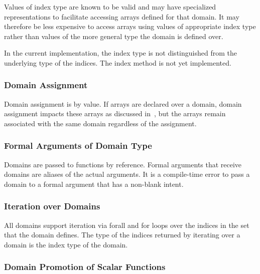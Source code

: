 Values of index type are known to be valid and may have specialized
representations to facilitate accessing arrays defined for that
domain. It may therefore be less expensive to access arrays using
values of appropriate index type rather than values of the more
general type the domain is defined over.

\begin{implementation}
In the current implementation, the index type is not distinguished
from the underlying type of the indices.  The index method is not yet
implemented.
\end{implementation}

\subsubsection{Domain Assignment}
\label{Domain_Assignment}

Domain assignment is by value.  If arrays are declared over a domain,
domain assignment impacts these arrays as discussed
in~, but the arrays remain
associated with the same domain regardless of the assignment.

\subsubsection{Formal Arguments of Domain Type}
\label{Formal_Arguments_of_Domain_Type}

Domains are passed to functions by reference.  Formal arguments that
receive domains are aliases of the actual arguments.  It is a
compile-time error to pass a domain to a formal argument that has a
non-blank intent.

\subsubsection{Iteration over Domains}
\label{Iteration_over_Domains}

All domains support iteration via forall and for loops over the
indices in the set that the domain defines.  The type of the indices
returned by iterating over a domain is the index type of the domain.

\subsubsection{Domain Promotion of Scalar Functions}
\label{Domain_Promotion_of_Scalar_Functions}

